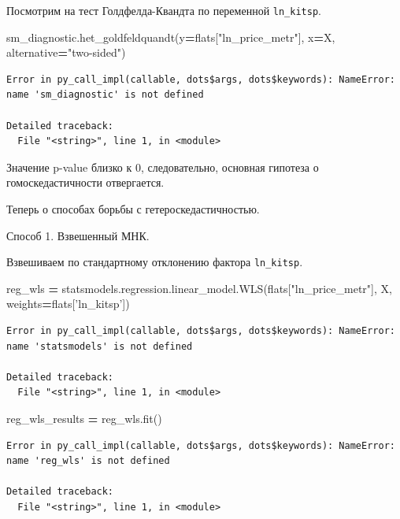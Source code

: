 \documentclass[]{book}
\newenvironment{Shaded}{\begin{snugshade}}{\end{snugshade}}
\newcommand{\NormalTok}[1]{#1}
\newcommand{\OperatorTok}[1]{\textcolor[rgb]{0.81,0.36,0.00}{\textbf{#1}}}
\newcommand{\StringTok}[1]{\textcolor[rgb]{0.31,0.60,0.02}{#1}}
\begin{document}
Посмотрим на тест Голдфелда-Квандта по переменной \texttt{ln\_kitsp}.

\begin{Shaded}
\begin{Highlighting}[]
\NormalTok{sm_diagnostic.het_goldfeldquandt(y}\OperatorTok{=}\NormalTok{flats[}\StringTok{"ln_price_metr"}\NormalTok{], x}\OperatorTok{=}\NormalTok{X, alternative}\OperatorTok{=}\StringTok{"two-sided"}\NormalTok{)}
\end{Highlighting}
\end{Shaded}

\begin{verbatim}
Error in py_call_impl(callable, dots$args, dots$keywords): NameError: name 'sm_diagnostic' is not defined

Detailed traceback: 
  File "<string>", line 1, in <module>
\end{verbatim}

Значение p-value близко к 0, следовательно, основная гипотеза о гомоскедастичности отвергается.

Теперь о способах борьбы с гетероскедастичностью.

Способ 1. Взвешенный МНК.

Взвешиваем по стандартному отклонению фактора \texttt{ln\_kitsp}.

\begin{Shaded}
\begin{Highlighting}[]
\NormalTok{reg_wls }\OperatorTok{=}\NormalTok{ statsmodels.regression.linear_model.WLS(flats[}\StringTok{"ln_price_metr"}\NormalTok{], X, weights}\OperatorTok{=}\NormalTok{flats[}\StringTok{'ln_kitsp'}\NormalTok{])}
\end{Highlighting}
\end{Shaded}

\begin{verbatim}
Error in py_call_impl(callable, dots$args, dots$keywords): NameError: name 'statsmodels' is not defined

Detailed traceback: 
  File "<string>", line 1, in <module>
\end{verbatim}

\begin{Shaded}
\begin{Highlighting}[]
\NormalTok{reg_wls_results }\OperatorTok{=}\NormalTok{ reg_wls.fit()}
\end{Highlighting}
\end{Shaded}

\begin{verbatim}
Error in py_call_impl(callable, dots$args, dots$keywords): NameError: name 'reg_wls' is not defined

Detailed traceback: 
  File "<string>", line 1, in <module>
\end{verbatim}
\end{document}
